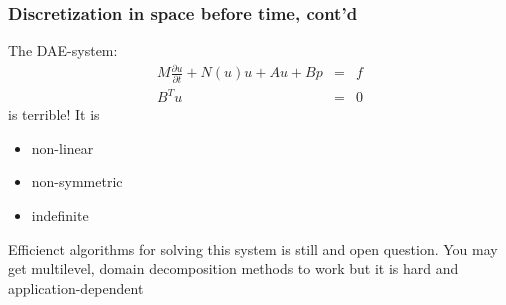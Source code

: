 \begin{frame}
\frametitle{Discretization in space before time, cont'd}
The DAE-system:  
\begin{eqnarray*}
M \frac{\partial u}{\partial t} +  N(u) u  +  A u +  B p &=& f  \\
B^T u &=& 0 
\end{eqnarray*}
is terrible! It is  
\begin{itemize}
\item non-linear  
\item non-symmetric 
\item indefinite 
\end{itemize}
Efficienct algorithms for solving this system is still and open question. 
You may get multilevel, domain decomposition methods to work but 
it is hard and application-dependent 
\end{frame}


